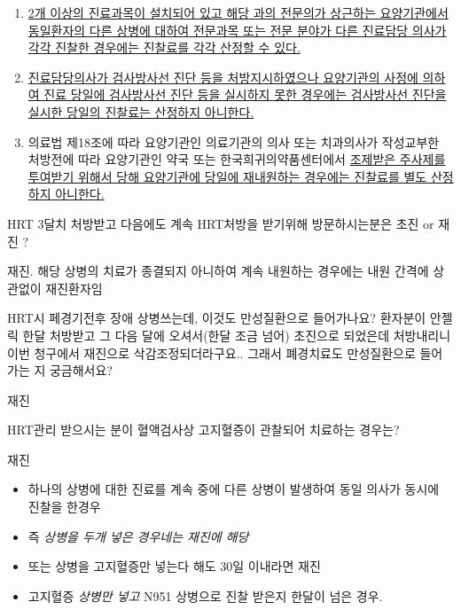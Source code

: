 \begin{enumerate}[1.]
\begin{enumerate}[가.]
\begin{enumerate}[(1)]
		\end{enumerate}
	\item \uline{2개 이상의 진료과목이 설치되어 있고 해당 과의 전문의가 상근하는 요양기관에서 동일환자의 다른 상병에 대하여 전문과목 또는 전문 분야가 다른 진료담당 의사가 각각 진찰한 경우에는 진찰료를 각각 산정할 수 있다.}
	\item \uline{진료담당의사가 검사\bullet 방사선 진단 등을 처방지시하였으나 요양기관의 사정에 의하여 진료 당일에 검사\bullet 방사선 진단 등을 실시하지 못한 경우에는 검사\bullet 방사선 진단을 실시한 당일의 진찰료는 산정하지 아니한다.}
	\item 의료법 제18조에 따라 요양기관인 의료기관의 의사 또는 치과의사가 작성\bullet 교부한 처방전에 따라 요양기관인 약국 또는 한국희귀의약품센터에서 \uline{조제받은 주사제를 투여받기 위해서 당해 요양기관에 당일에 재내원하는 경우에는 진찰료를 별도 산정하지 아니한다.}
	\end{enumerate}
\end{enumerate}

HRT 3달치 처방받고 다음에도 계속 HRT처방을 받기위해 방문하시는분은 초진 or 재진 ?
\begin{quotebox}
재진. 해당 상병의 치료가 종결되지 아니하여 계속 내원하는 경우에는 내원 간격에 상관없이 재진환자임
\end{quotebox}
HRT시 페경기전후 장애 상병쓰는데, 이것도 만성질환으로 들어가나요? 환자분이 안젤릭 한달 처방받고 그 다음 달에 오셔서(한달 조금 넘어) 초진으로 되었은데 처방내리니 이번 청구에서 재진으로 삭감조정되더라구요.. 그래서 폐경치료도 만성질환으로 들어가는 지 궁금해서요?
\begin{quotebox}
재진
\end{quotebox}

HRT관리 받으시는 분이 혈액검사상 고지혈증이 관찰되어 치료하는 경우는? 

\begin{commentbox}{재진}
\begin{itemize}\tightlist
\item 하나의 상병에 대한 진료를 계속 중에 다른 상병이 발생하여 동일 의사가 동시에 진찰을 한경우
\item 즉 \emph{상병을 두개 넣은 경우네는 재진에 해당}
\item 또는 상병을 고지혈증만 넣는다 해도 30일 이내라면 재진
\end{itemize}
\begin{itemize}\tightlist
\item 고지혈증 \emph{상병만 넣고} N951 상병으로 진찰 받은지 한달이 넘은 경우.
\end{itemize}
\end{commentbox}

